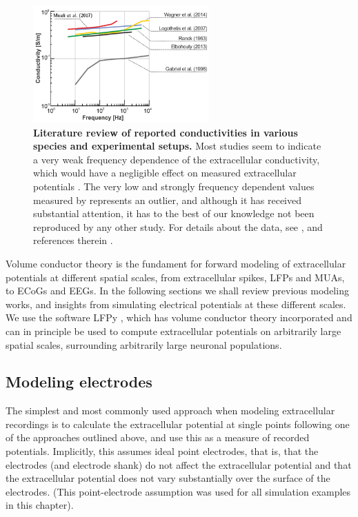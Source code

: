 \documentclass[preprint,11pt,authoryear]{elsarticle}
\begin{document}
\begin{figure}[!ht]
\begin{center}
\includegraphics[width=0.6\textwidth]{frequency_dependence}
\end{center}
\caption{\textbf{Literature review of reported conductivities in various species and experimental setups.} 
Most studies seem to indicate a very weak frequency dependence of the extracellular conductivity, which would have a negligible effect on measured extracellular potentials \citep{Miceli2017}. The very low and strongly frequency dependent values measured by \cite{Gabriel1996} represents an outlier, and although it has received substantial attention, it has to the best of our knowledge not been reproduced by any other study.
For details about the data, see \citep{Miceli2017}, and references therein \citep{Ranck1963, Gabriel1996, Logothetis2007, Elbohouty2013, Wagner2014}.
}
\label{fig:freq_dep}
\end{figure}


Volume conductor theory is the fundament for forward modeling of extracellular potentials at different spatial scales, from extracellular spikes, LFPs and MUAs, to ECoGs and EEGs. In the following sections we shall review previous modeling works, and insights from simulating electrical potentials at these different scales.
We use the software LFPy \citep{Linden2014, Hagen2018, Hagen2019}, which has volume conductor theory incorporated and can in principle be used to compute extracellular potentials on arbitrarily large spatial scales, surrounding arbitrarily large neuronal populations. 

\subsection{Modeling electrodes}

The simplest and most commonly used approach when modeling extracellular recordings is to calculate the extracellular potential at single points following one of the approaches outlined above, and use this as a measure of recorded potentials. Implicitly, this 
assumes ideal point electrodes, that is, that the electrodes (and electrode shank) do not affect the extracellular potential and that the extracellular potential does not vary substantially over the surface of the electrodes. (This point-electrode assumption was used for all simulation examples in this chapter).
\end{document}
